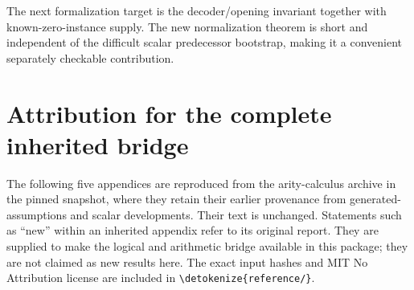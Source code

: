 \documentclass[11pt,letterpaper]{article}
\theoremstyle{definition}\newtheorem{definition}[theorem]{Definition}
\theoremstyle{remark}\newtheorem{remark}[theorem]{Remark}
\newcommand{\file}[1]{\expandafter\nolinkurl\expandafter{\detokenize{#1}}}
\begin{document}
The next formalization target is the decoder/opening invariant together
with known-zero-instance supply. The new normalization theorem is short
and independent of the difficult scalar predecessor bootstrap, making it
a convenient separately checkable contribution.

\clearpage
\appendix
\section{Attribution for the complete inherited bridge}

The following five appendices are reproduced from the arity-calculus
archive in the pinned snapshot, where they retain their earlier
provenance from generated-assumptions and scalar developments. Their
text is unchanged. Statements such as ``new'' within an inherited
appendix refer to its original report. They are supplied to make the
logical and arithmetic bridge available in this package; they are not
claimed as new results here. The exact input hashes and MIT No Attribution
license are included in \file{reference/}.






\end{document}
